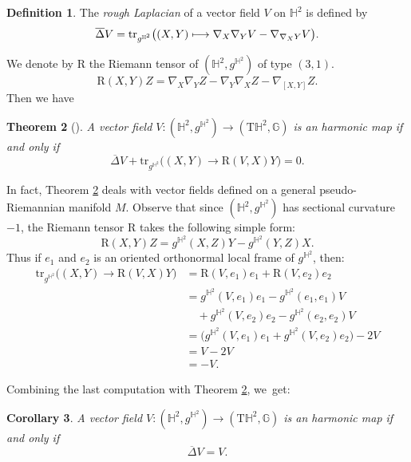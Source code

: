 \documentclass[11pt]{article}
\newcommand\mto{\mathchoice{\longmapsto}{\mapsto}{\mapsto}{\mapsto}}
\let\ra\rightarrow
\theoremstyle{plain}
\newtheorem{cor}{Corollary}[section]
\newtheorem{theorem}[cor]{Theorem}
\theoremstyle{definition}
\newtheorem{defi}[cor]{Definition}
\begin{document}
\begin{defi}
The \emph{rough Laplacian} of a vector field $V$ on $\mathbb{H}^2$ is defined by
\[
\overline{\Delta}V=\mathrm{tr}_{g^{\mathbb{H}^2}}\big((X,Y)\mto \nabla_X\nabla_Y V-\nabla_{\nabla_X Y}V \big).
\]
\end{defi}
We denote by $\mathrm{R}$ the Riemann tensor of $(\mathbb{H}^2,g^{\mathbb{H}^2})$ of type $(3,1)$.
\[
\mathrm{R}(X,Y)Z=\nabla_X\nabla_YZ-\nabla_Y\nabla_XZ-\nabla_{[X,Y]}Z.
\]
Then we have
\begin{theorem}[{\cite[Prop.\,4.1]{on_harmonic_vector_field}}]\label{on_harmonic_vector_field}
A vector field $V:(\mathbb{H}^2,g^{\mathbb{H}^2})\to(\mathrm{T}\mathbb{H}^2,\mathbb{G})$ is an harmonic map if and only if
\[
\overline{\Delta}V+\mathrm{tr}_{g^{\mathbb{H}^2}}\big((X,Y)\ra\mathrm{R}(V,X)Y \big)=0.
\]
\end{theorem}
In fact, Theorem \ref{on_harmonic_vector_field} deals with vector fields defined on a general pseudo-Riemannian manifold $M$. Observe that since $(\mathbb{H}^2,g^{\mathbb{H}^2})$ has sectional curvature $-1$, the Riemann tensor $\mathrm{R}$ takes the following simple form:
\[
\mathrm{R}(X,Y)Z=g^{\mathbb{H}^2}(X,Z)Y-g^{\mathbb{H}^2}(Y,Z)X.
\]
Thus if $e_1$ and $e_2$ is an oriented orthonormal local frame of $g^{\mathbb{H}^2}$, then:
\begin{align*}
\mathrm{tr}_{g^{\mathbb{H}^2}}\big((X,Y)\to\mathrm{R}(V,X)Y \big)
&=\mathrm{R}(V,e_1)e_1+\mathrm{R}(V,e_2)e_2 \\
&= g^{\mathbb{H}^2}(V,e_1)e_1 - g^{\mathbb{H}^2}(e_1,e_1)V \\
&\quad + g^{\mathbb{H}^2}(V,e_2)e_2 - g^{\mathbb{H}^2}(e_2,e_2)V \\
&= \big(g^{\mathbb{H}^2}(V,e_1)e_1+g^{\mathbb{H}^2}(V,e_2)e_2\big)-2V \\
&= V-2V \\
&= -V.
\end{align*}

Combining the last computation with Theorem \ref{on_harmonic_vector_field}, we~get:

\begin{cor}\label{cor_on_harmonic_vector_field}
A vector field $V:(\mathbb{H}^2,g^{\mathbb{H}^2})\to(\mathrm{T}\mathbb{H}^2,\mathbb{G})$ is an harmonic map if and only if
\[
\overline{\Delta}V=V.
\]
\end{cor}
\end{document}
